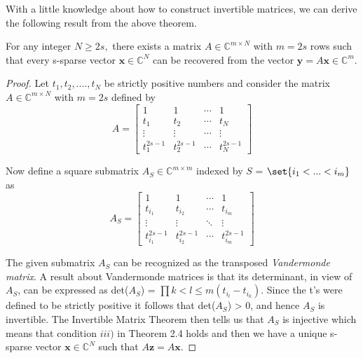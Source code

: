 With a little knowledge about how to construct invertible matrices, we can derive the following result from the above theorem.



\begin{tcolorbox}[colback=green,colframe=white]
\begin{corollary}
For any integer $N \geq 2s,$ there exists a matrix $A \in \mathbb{C}^{m \times N}$ with $m = 2s$ rows such that every s-sparse vector $\mathbf{x} \in \mathbb{C}^{N}$ can be recovered from the vector $\mathbf{y}=A\mathbf{x} \in \mathbb{C}^{m}$. 
\end{corollary}
\end{tcolorbox}

\begin{proof}
Let $t_1,t_2,....,t_N$ be strictly positive numbers and consider the matrix $A \in \mathbb{C}^{m \times N}$ with $m = 2s$ defined by 
\begin{equation*}
A =
\begin{bmatrix}
   1 & 1 & \cdots & 1 \\
   t_1 & t_2 & \cdots & t_N \\
   \vdots  & \vdots  & \cdots & \vdots  \\
   t_{1}^{2s-1} & t_{2}^{2s-1} & \cdots & t_{N}^{2s-1}
 \end{bmatrix}
\end{equation*}

Now define a square submatrix $A_S \in \mathbb{C}^{m \times m}$ indexed by $S$ = $\set{i_1 < ... < i_m}$ as 
\begin{equation*}
A_S =
\begin{bmatrix}
   1 & 1 & \cdots & 1 \\
   t_{i_1} & t_{i_2} & \cdots & t_{i_m} \\
   \vdots  & \vdots  & \ddots & \vdots  \\
   t_{i_1}^{2s-1} & t_{i_2}^{2s-1} & \cdots & t_{i_m}^{2s-1}
 \end{bmatrix}
\end{equation*}

The given submatrix $A_S$ can be recognized as the transposed \emph{Vandermonde matrix}. A result about Vandermonde matrices is that its determinant, in view of $A_S$, can be expressed as det($A_S$) = $\prod{k<l \leq m}(t_{i_l} - t_{i_k})$.  Since the t's were defined to be strictly positive it follows that det($A_S$) > 0, and hence $A_S$ is invertible. The Invertible Matrix Theorem then tells us that $A_S$ is injective which means that condition $iii)$ in Theorem 2.4 holds and then we have a unique s-sparse vector $\mathbf{x} \in \mathbb{C}^N$ such that  $A \mathbf{z} = A \mathbf{x}$.
\end{proof}

